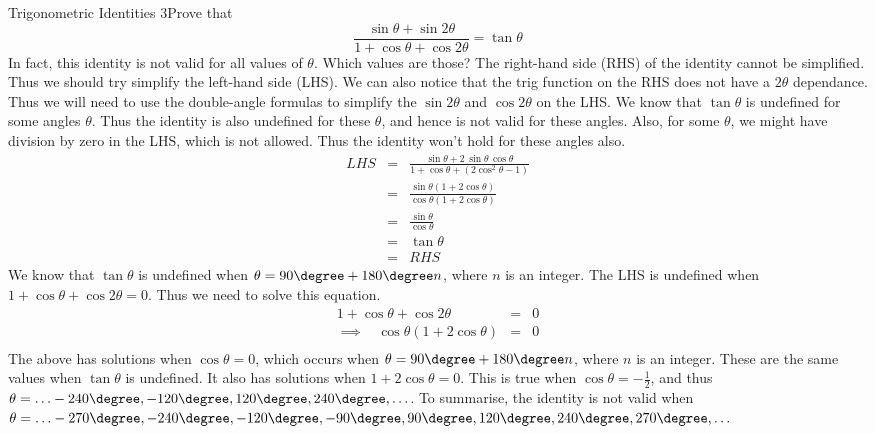 \begin{wex}{Trigonometric Identities 3}{Prove that $$\frac{\sin \theta+\sin  2\theta}{1+\cos\theta+\cos 2\theta}=\tan \theta$$
In fact, this identity is not valid for all values of $\theta$. Which values are those?}
{
The right-hand side (RHS) of the identity cannot be simplified. Thus we should try simplify the left-hand side (LHS). We can also notice that the trig function on the RHS does not have a $2\theta$ dependance. Thus we will need to use the double-angle formulas to simplify the $\sin 2\theta$ and $\cos 2\theta$ on the LHS. 
We know that $\tan\theta$ is undefined for some angles $\theta$. Thus the identity is also undefined for these $\theta$, and hence is not valid for these angles. Also, for some $\theta$, we might have division by zero in the LHS, which is not allowed. Thus the identity won't hold for these angles also.
\begin{eqnarray*}
LHS&=&\frac{\sin\theta+2\,\sin \theta\,\cos \theta}{1+\cos\theta +(2 \cos^2\theta-1)}\\
&=&\frac{\sin\theta(1+2 \cos\theta)}{\cos\theta(1+2\cos\theta)}\\
&=&\frac{\sin\theta}{\cos\theta}\\
&=&\tan\theta\\
&=&RHS
\end{eqnarray*}
We know that $\tan\theta$ is undefined when $\theta=90\degree+180\degree n$, where $n$ is an integer. 
The LHS is undefined when $1+\cos\theta+\cos 2\theta=0$. Thus we need to solve this equation.
\begin{eqnarray*}
1+\cos \theta+\cos 2\theta&=&0\\
\implies \ \ \ \ \cos \theta (1+2\cos\theta)&=&0\\
\end{eqnarray*}
The above has solutions when $\cos\theta=0$, which occurs when $\theta=90\degree+180\degree n$, where $n$ is an integer. These are the same values when $\tan\theta$ is undefined. It also has solutions when $1+2\cos\theta=0$. This is true when $\cos\theta=-\frac{1}{2}$, and thus $\theta=\ldots -240\degree, -120\degree, 120\degree, 240\degree, \ldots$. 
To summarise, the identity is not valid when $\theta=\ldots -270\degree, -240\degree, -120\degree, -90\degree,90\degree, 120\degree, 240\degree, 270\degree, \ldots$
}
\end{wex}


